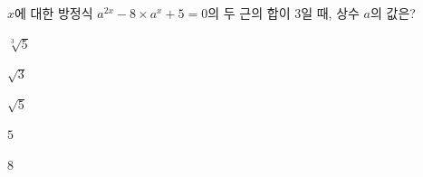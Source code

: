$x$에 대한 방정식 $a^{2x}-8\times a^x+5=0$의 두 근의 합이 $3$일 때, 상수 $a$의 값은? 
\begin{choices32}{\rule[-3ex]{0pt}{8ex}$\sqrt[3]{5}$}{\rule[-3ex]{0pt}{8ex}$\sqrt{3}$}{\rule[-3ex]{0pt}{8ex}$\sqrt{5}$}{\rule[-3ex]{0pt}{8ex}$5$}{\rule[-3ex]{0pt}{8ex}$8$}\end{choices32}
